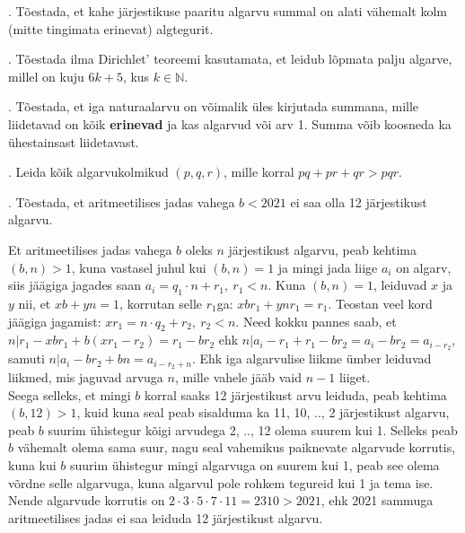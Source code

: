 \documentclass[a4paper, 10pt]{article}
\newcommand{\N}{\mathbb{N}}
\begin{document}
\bigskip

. Tõestada, et kahe järjestikuse paaritu algarvu summal on alati vähemalt kolm (mitte tingimata erinevat) algtegurit. 

\bigskip

. T\~oestada ilma Dirichlet' teoreemi kasutamata, et leidub l\~opmata palju algarve, millel on kuju $6k+5$, kus $k\in \N$. 

\bigskip

. Tõestada, et iga naturaalarvu on võimalik üles kirjutada summana, mille liidetavad on kõik {\bf erinevad} ja kas algarvud või arv 1. Summa võib koosneda ka ühestainsast liidetavast. 

\bigskip

. Leida kõik algarvukolmikud $(p,q,r)$, mille korral $pq + pr + qr > pqr$. 

\bigskip

. Tõestada, et aritmeetilises jadas vahega $b<2021$ ei saa olla 12 järjestikust algarvu. 

\bigskip

Et aritmeetilises jadas vahega $b$ oleks $n$ järjestikust algarvu, peab kehtima $(b,n)>1$, kuna vastasel juhul kui $(b,n)=1$ ja mingi jada liige $a_i$ on algarv, siis jäägiga jagades saan $a_i=q_1\cdot n+r_1,\ r_1<n$. Kuna $(b,n)=1$, leiduvad $x$ ja $y$ nii, et $xb+yn=1$, korrutan selle $r_1$ga: $xbr_1+ynr_1=r_1$. Teostan veel kord jäägiga jagamist: $xr_1=n\cdot q_2+r_2,\ r_2<n$. Need kokku pannes saab, et $n|r_1-xbr_1+b(xr_1-r_2)=r_1-br_2$ ehk $n|a_i-r_1+r_1-br_2=a_i-br_2=a_{i-r_2}$, samuti $n|a_i-br_2+bn=a_{i-r_2+n}$. Ehk iga algarvulise liikme ümber leiduvad liikmed, mis jaguvad arvuga $n$, mille vahele jääb vaid $n-1$ liiget.\\
\indent Seega selleks, et mingi $b$ korral saaks 12 järjestikust arvu leiduda, peab kehtima $(b,12)>1$, kuid kuna seal peab sisalduma ka 11, 10, .., 2 järjestikust algarvu, peab $b$ suurim ühistegur kõigi arvudega 2, .., 12 olema suurem kui 1. Selleks peab $b$ vähemalt olema sama suur, nagu seal vahemikus paiknevate algarvude korrutis, kuna kui $b$ suurim ühistegur mingi algarvuga on suurem kui 1, peab see olema võrdne selle algarvuga, kuna algarvul pole rohkem tegureid kui 1 ja tema ise. Nende algarvude korrutis on $2\cdot3\cdot5\cdot7\cdot11=2310>2021$, ehk 2021 sammuga aritmeetilises jadas ei saa leiduda 12 järjestikust algarvu.
\end{document}
